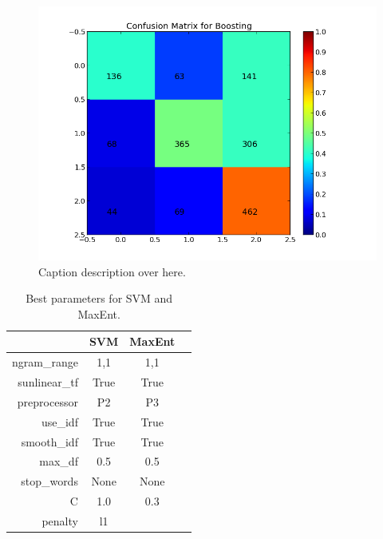 \begin{figure}[H]
 \begin{center}
     \includegraphics[width=0.7\linewidth]{../img/plots/grid/confusion_matrix_Boosting.png}
 \end{center}
 \caption[Results overview across models]{Caption description over here.}
 \label{fig:confmat_boosting}
\end{figure}


\begin{table}[htb]
\centering
\begin{tabular}{|r||c|c|c|} 
\cline{2-3}
\multicolumn{1}{c|}{ } & \textbf{SVM} & \textbf{MaxEnt} \\ \hline
ngram\_range & 1,1 & 1,1 \\ \hline
sunlinear\_tf  & True & True \\ \hline
preprocessor & P2 & P3 \\ \hline
use\_idf & True & True \\ \hline
smooth\_idf & True & True \\ \hline
max\_df & 0.5 & 0.5 \\ \hline
stop\_words & None & None \\ \hline
C & 1.0 & 0.3 \\ \hline
penalty & l1 & \\ \hline

\end{tabular}
\caption{Best parameters for SVM and MaxEnt.}
\label{tab:svm_maxent_best_params}
\end{table}



